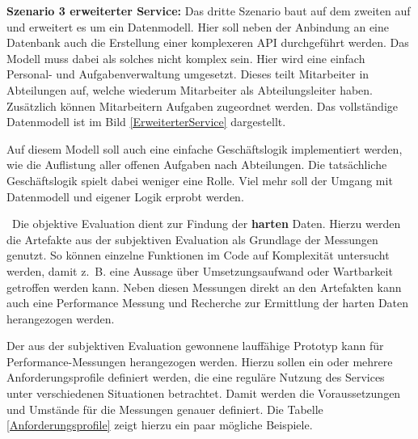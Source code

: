 \textbf{Szenario 3 erweiterter Service:} Das dritte Szenario baut auf dem zweiten auf und erweitert es um ein Datenmodell. Hier soll neben der Anbindung an eine Datenbank auch die Erstellung einer komplexeren API durchgeführt werden. Das Modell muss dabei als solches nicht komplex sein. Hier wird eine einfach Personal- und Aufgabenverwaltung umgesetzt. Dieses teilt Mitarbeiter in Abteilungen auf, welche wiederum Mitarbeiter als Abteilungsleiter haben. Zusätzlich können Mitarbeitern Aufgaben zugeordnet werden. Das vollständige Datenmodell ist im Bild \ref{ErweiterterService} dargestellt.


Auf diesem Modell soll auch eine einfache Geschäftslogik implementiert werden, wie die Auflistung aller offenen Aufgaben nach Abteilungen. Die tatsächliche Geschäftslogik spielt dabei weniger eine Rolle. Viel mehr soll der Umgang mit Datenmodell und eigener Logik erprobt werden.

	
\
Die objektive Evaluation dient zur Findung der \textbf{harten} Daten. Hierzu werden die Artefakte aus der subjektiven Evaluation als Grundlage der Messungen genutzt. So können einzelne Funktionen im Code auf Komplexität untersucht werden, damit z.~B. eine Aussage über Umsetzungsaufwand oder Wartbarkeit getroffen werden kann. Neben diesen Messungen direkt an den Artefakten kann auch eine Performance Messung und Recherche zur Ermittlung der harten Daten herangezogen werden. 

Der aus der subjektiven Evaluation gewonnene lauffähige Prototyp kann für Performance-Messungen herangezogen werden. Hierzu sollen ein oder mehrere Anforderungsprofile definiert werden, die eine reguläre Nutzung des Services unter verschiedenen Situationen betrachtet. Damit werden die Voraussetzungen und Umstände für die Messungen genauer definiert. Die Tabelle \ref{Anforderungsprofile} zeigt hierzu ein paar mögliche Beispiele. 

